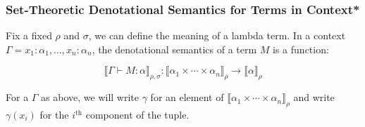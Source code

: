 \documentclass[aspectratio=169]{beamer}
\begin{document}
\begin{frame}
\frametitle{Set-Theoretic Denotational Semantics for Terms in Context*}

Fix a fixed $\rho$ and $\sigma$, we can define the meaning of a lambda term.
In a context $\Gamma = x_1 : \alpha_1, \ldots, x_n : \alpha_n$, the denotational semantics of a term $M$ is a function:

\[
\llbracket \Gamma \vdash M : \alpha \rrbracket_{\rho, \sigma} : \llbracket \alpha_1 \times \cdots \times \alpha_n \rrbracket_\rho \to \llbracket \alpha \rrbracket_\rho
\]

For a $\Gamma$ as above, we will write $\gamma$ for an element of $\llbracket \alpha_1 \times \cdots \times \alpha_n \rrbracket_\rho$ and write $\gamma(x_i)$ for the $i^{\text{th}}$ component of the tuple.
\end{frame}
\end{document}
